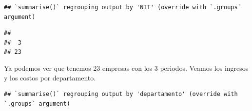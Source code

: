 \documentclass[
  11pt,
]{book}
\newenvironment{Shaded}{\begin{snugshade}}{\end{snugshade}}
\newcommand{\DataTypeTok}[1]{\textcolor[rgb]{0.13,0.29,0.53}{#1}}
\newcommand{\DecValTok}[1]{\textcolor[rgb]{0.00,0.00,0.81}{#1}}
\newcommand{\KeywordTok}[1]{\textcolor[rgb]{0.13,0.29,0.53}{\textbf{#1}}}
\newcommand{\NormalTok}[1]{#1}
\newcommand{\OperatorTok}[1]{\textcolor[rgb]{0.81,0.36,0.00}{\textbf{#1}}}
\newcommand{\StringTok}[1]{\textcolor[rgb]{0.31,0.60,0.02}{#1}}
\begin{document}
\begin{verbatim}
## `summarise()` regrouping output by 'NIT' (override with `.groups` argument)
\end{verbatim}

\begin{Shaded}
\end{Shaded}

\begin{verbatim}
## 
##  3 
## 23
\end{verbatim}

Ya podemos ver que tenemos 23 empresas con los 3 periodos. Veamos los
ingresos y los costos por departamento.

\begin{Shaded}
\end{Shaded}

\begin{verbatim}
## `summarise()` regrouping output by 'departamento' (override with `.groups` argument)
\end{verbatim}
\end{document}
